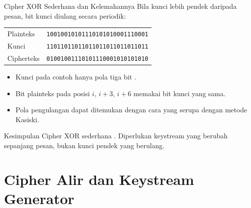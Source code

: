 \documentclass[aspectratio=169,11pt]{beamer}
\begin{document}
\begin{frame}{Cipher XOR Sederhana dan Kelemahannya}
    \footnotesize
    Bila kunci lebih pendek daripada pesan, bit kunci diulang secara
    periodik:
    \vspace{0.1cm}
    \begin{center}
        \footnotesize
        \begin{tabular}{@{}l@{\quad}l@{}}
            Plainteks  & \texttt{10010010101110101010001110001} \\
            Kunci      & \texttt{11011011011011011011011011011} \\
            Cipherteks & \texttt{01001001110101110001010101010} \\
        \end{tabular}
    \end{center}
    \vspace{0.1cm}
    \begin{itemize}
        \item Kunci pada contoh hanya pola tiga bit .
        \item Bit plainteks pada posisi $i$, $i+3$, $i+6$ memakai bit kunci
              yang sama.
        \item Pola pengulangan dapat ditemukan dengan cara yang serupa
              dengan metode Kasiski.
    \end{itemize}
    \begin{alertblock}{Kesimpulan}
        Cipher XOR sederhana . Diperlukan keystream yang
        berubah sepanjang pesan, bukan kunci pendek yang berulang.
    \end{alertblock}
\end{frame}

\section{Cipher Alir dan Keystream Generator}
\end{document}
